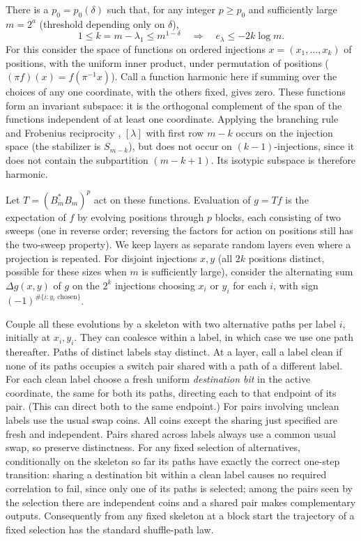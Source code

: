 There is a \(p_0=p_0(\delta)\) such that, for any integer \(p\ge p_0\) and sufficiently large \(m=2^a\) (threshold depending only on \(\delta\)),
\begin{equation}
 1\le k=m-\lambda_1\le m^{1-\delta}
 \quad\Longrightarrow\quad e_\lambda\le -2k\log m.                     \label{ten:simultaneous:eq:1}
\end{equation}
For this consider the space of functions on ordered injections \(x=(x_1,\ldots,x_k)\) of positions, with the uniform inner product, under permutation of positions (\((\pi f)(x)=f(\pi^{-1}x)\)). Call a function harmonic here if summing over the choices of any one coordinate, with the others fixed, gives zero. These functions form an invariant subspace: it is the orthogonal complement of the span of the functions independent of at least one coordinate. Applying the branching rule \cite[Theorem~5.8]{VershikOkounkov2005} and Frobenius reciprocity \cite[Theorem~4.33]{etingof}, \([\lambda]\) with first row \(m-k\) occurs on the injection space (the stabilizer is \(S_{m-k}\)), but does not occur on \((k-1)\)-injections, since it does not contain the subpartition \((m-k+1)\). Its isotypic subspace is therefore harmonic.

Let \(T=(B_m^* B_m)^p\) act on these functions. Evaluation of \(g=T f\) is the expectation of \(f\) by evolving positions through \(p\) blocks, each consisting of two sweeps (one in reverse order; reversing the factors for action on positions still has the two-sweep property). We keep layers as separate random layers even where a projection is repeated. For disjoint injections \(x,y\) (all \(2k\) positions distinct, possible for these sizes when \(m\) is sufficiently large), consider the alternating sum \(\Delta g(x,y)\) of \(g\) on the \(2^k\) injections choosing \(x_i\) or \(y_i\) for each \(i\), with sign \((-1)^{\#\{i:y_i\text{ chosen}\}}\).

Couple all these evolutions by a skeleton with two alternative paths per label \(i\), initially at \(x_i,y_i\). They can coalesce within a label, in which case we use one path thereafter. Paths of distinct labels stay distinct. At a layer, call a label clean if none of its paths occupies a switch pair shared with a path of a different label. For each clean label choose a fresh uniform \emph{destination bit} in the active coordinate, the same for both its paths, directing each to that endpoint of its pair. (This can direct both to the same endpoint.) For pairs involving unclean labels use the usual swap coins. All coins except the sharing just specified are fresh and independent. Pairs shared across labels always use a common usual swap, so preserve distinctness. For any fixed selection of alternatives, conditionally on the skeleton so far its paths have exactly the correct one-step transition: sharing a destination bit within a clean label causes no required correlation to fail, since only one of its paths is selected; among the pairs seen by the selection there are independent coins and a shared pair makes complementary outputs. Consequently from any fixed skeleton at a block start the trajectory of a fixed selection has the standard shuffle-path law.

